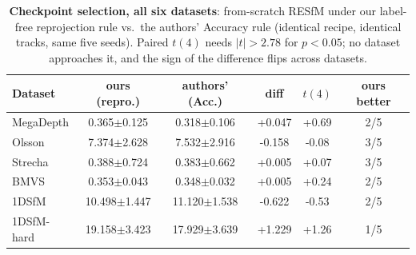 \documentclass[10pt,twocolumn,letterpaper]{article}
\begin{document}
\begin{table}[h]\centering\footnotesize
\caption{\textbf{Checkpoint selection, all six datasets}: from-scratch RESfM under our
label-free reprojection rule vs.\ the authors' Accuracy rule (identical recipe, identical
tracks, same five seeds). Paired $t(4)$ needs $|t|>2.78$ for $p<0.05$; no dataset
approaches it, and the sign of the difference flips across datasets.}
\label{tab:selrules}
\setlength{\tabcolsep}{4pt}%
\begin{tabular}{lccccc}
\toprule
Dataset & ours (repro.) & authors' (Acc.) & diff & $t(4)$ & ours better\\
\midrule
MegaDepth & 0.365$\pm$0.125 & 0.318$\pm$0.106 & +0.047 & +0.69 & 2/5\\
Olsson & 7.374$\pm$2.628 & 7.532$\pm$2.916 & -0.158 & -0.08 & 3/5\\
Strecha & 0.388$\pm$0.724 & 0.383$\pm$0.662 & +0.005 & +0.07 & 3/5\\
BMVS & 0.353$\pm$0.043 & 0.348$\pm$0.032 & +0.005 & +0.24 & 2/5\\
1DSfM & 10.498$\pm$1.447 & 11.120$\pm$1.538 & -0.622 & -0.53 & 2/5\\
1DSfM-hard & 19.158$\pm$3.423 & 17.929$\pm$3.639 & +1.229 & +1.26 & 1/5\\
\bottomrule
\end{tabular}
\end{table}
\end{document}
